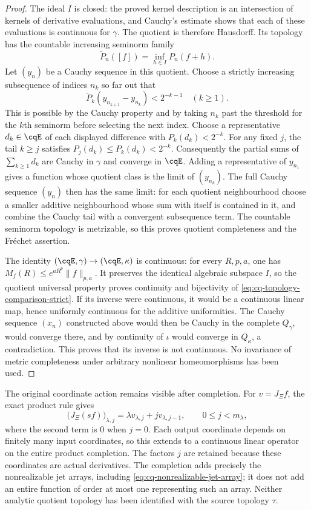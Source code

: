 \begin{proof}
The ideal $I$ is closed: the proved kernel description is an
intersection of kernels of derivative evaluations, and Cauchy's
estimate shows that each of these evaluations is continuous for
$\gamma$. The quotient is therefore Hausdorff. Its topology has
the countable increasing seminorm family
\[
 \widetilde P_n([f])=\inf_{h\in I}P_n(f+h).
\]
Let $(y_n)$ be a Cauchy sequence in this quotient. Choose a
strictly increasing subsequence of indices $n_k$ so far out that
\[
 \widetilde P_k(y_{n_{k+1}}-y_{n_k})<2^{-k-1}
 \quad(k\geq1).
\]
This is possible by the Cauchy property and by taking $n_k$ past
the threshold for the $k$th seminorm before selecting the next
index. Choose a representative $d_k\in\cqE$ of each displayed
difference with $P_k(d_k)<2^{-k}$. For any fixed $j$, the tail
$k\geq j$ satisfies $P_j(d_k)\leq P_k(d_k)<2^{-k}$.
Consequently the partial sums of $\sum_{k\geq1}d_k$ are
Cauchy in $\gamma$ and converge in $\cqE$. Adding a
representative of $y_{n_1}$ gives a function whose quotient class
is the limit of $(y_{n_k})$. The full Cauchy sequence $(y_n)$
then has the same limit: for each quotient neighbourhood choose
a smaller additive neighbourhood whose sum with itself is
contained in it, and combine the Cauchy tail with a convergent
subsequence term. The countable seminorm topology is metrizable,
so this proves quotient completeness and the Fr\'echet assertion.

The identity $(\cqE,\gamma)\to(\cqE,\kappa)$ is continuous:
for every $R,p,a$, one has $M_f(R)\leq e^{aR^p}\|f\|_{p,a}$.
It preserves the identical algebraic subspace $I$, so the
quotient universal property proves continuity and bijectivity
of \eqref{eq:cq-topology-comparison-strict}. If its inverse
were continuous, it would be a continuous linear map, hence
uniformly continuous for the additive uniformities. The Cauchy
sequence $(x_n)$ constructed above would then be Cauchy in the
complete $Q_\gamma$, would converge there, and by continuity of
$\iota$ would converge in $Q_\kappa$, a contradiction. This
proves that its inverse is not continuous. No invariance of
metric completeness under arbitrary nonlinear homeomorphisms
has been used.
\end{proof}

The original coordinate action remains visible after completion.
For $v=J_\Xi f$, the exact product rule gives
\begin{equation}\label{eq:cq-original-s-on-completed-jets}
 \bigl(J_\Xi(sf)\bigr)_{\lambda,j}
 =\lambda v_{\lambda,j}+jv_{\lambda,j-1},
 \qquad 0\leq j<m_\lambda,
\end{equation}
where the second term is $0$ when $j=0$. Each output coordinate
depends on finitely many input coordinates, so this extends to
a continuous linear operator on the entire product completion.
The factors $j$ are retained because these coordinates are actual
derivatives. The completion adds precisely the nonrealizable
jet arrays, including \eqref{eq:cq-nonrealizable-jet-array}; it
does not add an entire function of order at most one representing
such an array. Neither analytic quotient topology has been
identified with the source topology $\tau$.


